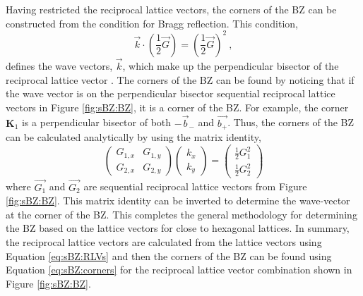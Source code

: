 Having restricted the reciprocal lattice vectors, the corners of the BZ can be constructed from the condition for Bragg reflection.
This condition,
\begin{equation*}
	\vec{k} \cdot \left(\frac{1}{2} \vec{G} \right)=\left(\frac{1}{2} \vec{G}\right)^2 \ ,
\end{equation*}
defines the wave vectors, $\vec{k}$, which make up the perpendicular bisector of the reciprocal lattice vector \cite{Kittel2005}.
The corners of the BZ can be found by noticing that if the wave vector is on the perpendicular bisector sequential reciprocal lattice vectors in Figure \ref{fig:sBZ:BZ}, it is a corner of the BZ.
For example, the corner $\bm{K}_1$ is a perpendicular bisector of both $-\vec{b}_-$ and $\vec{b_+}$.
Thus, the corners of the BZ can be calculated analytically by using the matrix identity,
\begin{equation}
	\left(\begin{array}{cc}
		G_{1,x} & G_{1,y} \\
		G_{2,x} & G_{2,y} \end{array} \right)
	\left(\begin{array}{c} k_x \\ k_y \end{array} \right)
	=
	\left( \begin{array}{c} \frac{1}{2} G_1^2 \\ \frac{1}{2} G_2^2 \end{array} \right)
	\label{eq:sBZ:corners}
\end{equation}
where $\vec{G_1}$ and $\vec{G_2}$ are sequential reciprocal lattice vectors from Figure \ref{fig:sBZ:BZ}.
This matrix identity can be inverted to determine the wave-vector at the corner of the BZ.
This completes the general methodology for determining the BZ based on the lattice vectors for close to hexagonal lattices.
In summary, the reciprocal lattice vectors are calculated from the lattice vectors using Equation \ref{eq:sBZ:RLVs} and then the corners of the BZ can be found using Equation \ref{eq:sBZ:corners} for the reciprocal lattice vector combination shown in Figure \ref{fig:sBZ:BZ}.

